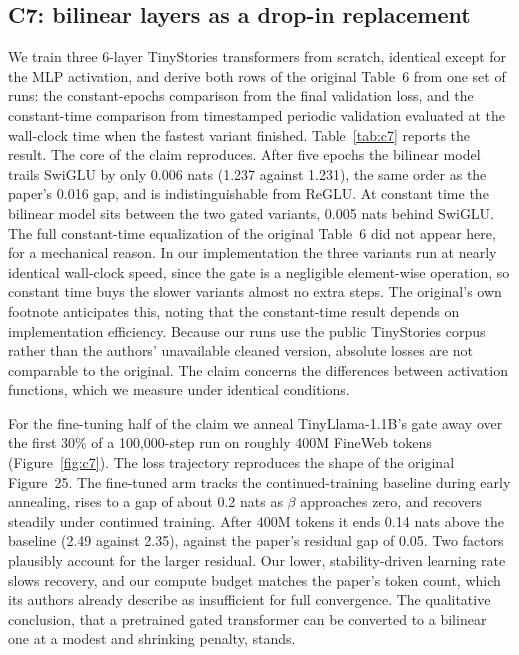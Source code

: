 \documentclass[10pt]{article} %
\begin{document}
\subsection{C7: bilinear layers as a drop-in replacement}

We train three 6-layer TinyStories transformers from scratch, identical except for
the MLP activation, and derive both rows of the original Table~6 from one set of
runs: the constant-epochs comparison from the final validation loss, and the
constant-time comparison from timestamped periodic validation evaluated at the
wall-clock time when the fastest variant finished. Table~\ref{tab:c7} reports the
result. The core of the claim reproduces. After five epochs the bilinear model
trails SwiGLU by only 0.006 nats (1.237 against 1.231), the same order as the
paper's 0.016 gap, and is indistinguishable from ReGLU. At constant time the
bilinear model sits between the two gated variants, 0.005 nats behind SwiGLU. The
full constant-time equalization of the original Table~6 did not appear here, for a
mechanical reason. In our implementation the three variants run at nearly identical
wall-clock speed, since the gate is a negligible element-wise operation, so constant
time buys the slower variants almost no extra steps. The original's own footnote
anticipates this, noting that the constant-time result depends on implementation
efficiency. Because our runs use the public TinyStories corpus rather than the
authors' unavailable cleaned version, absolute losses are not comparable to the
original. The claim concerns the differences between activation functions, which we
measure under identical conditions.

For the fine-tuning half of the claim we anneal TinyLlama-1.1B's gate away over the
first 30\% of a 100{,}000-step run on roughly 400M FineWeb tokens
(Figure~\ref{fig:c7}). The loss trajectory reproduces the shape of the original
Figure~25. The fine-tuned arm tracks the continued-training baseline during early
annealing, rises to a gap of about 0.2 nats as $\beta$ approaches zero, and recovers
steadily under continued training. After 400M tokens it ends 0.14 nats above the
baseline (2.49 against 2.35), against the paper's residual gap of 0.05. Two factors
plausibly account for the larger residual. Our lower, stability-driven learning rate
slows recovery, and our compute budget matches the paper's token count, which its
authors already describe as insufficient for full convergence. The qualitative
conclusion, that a pretrained gated transformer can be converted to a bilinear one at
a modest and shrinking penalty, stands.
\end{document}
